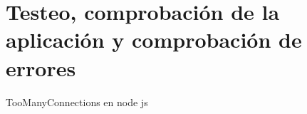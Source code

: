 \section{Testeo, comprobación de la aplicación y comprobación de errores}

TooManyConnections en node js